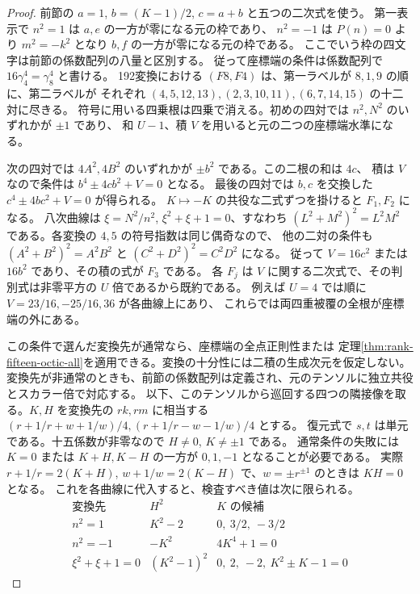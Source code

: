 \begin{proof}
前節の $a=1$, $b=(K-1)/2$, $c=a+b$ と五つの二次式を使う。
第一表示で $n^2=1$ は $a,e$ の一方が零になる元の枠であり、
$n^2=-1$ は $P(n)=0$ より $m^2=-k^2$ となり $b,f$ の一方が零になる元の枠である。
ここでいう枠の四文字は前節の係数配列の八量と区別する。
従って座標端の条件は係数配列で $16\gamma_4^4=\gamma_8^4$ と書ける。
192変換における $(F8,F4)$ は、第一ラベルが $8,1,9$ の順に、第二ラベルが
それぞれ $(4,5,12,13),(2,3,10,11),(6,7,14,15)$ の十二対に尽きる。
符号に用いる四乗根は四乗で消える。初めの四対では $n^2,N^2$ のいずれかが $\pm1$ であり、
和 $U-1$、積 $V$ を用いると元の二つの座標端水準になる。

次の四対では $4A^2,4B^2$ のいずれかが $\pm b^2$ である。この二根の和は $4c$、
積は $V$ なので条件は $b^4\pm4cb^2+V=0$ となる。
最後の四対では $b,c$ を交換した $c^4\pm4bc^2+V=0$ が得られる。
$K\mapsto-K$ の共役な二式ずつを掛けると $F_1,F_2$ になる。
八次曲線は $\xi=N^2/n^2$, $\xi^2+\xi+1=0$、すなわち
$(L^2+M^2)^2=L^2M^2$ である。各変換の $4,5$ の符号指数は同じ偶奇なので、
他の二対の条件も $(A^2+B^2)^2=A^2B^2$ と $(C^2+D^2)^2=C^2D^2$ になる。
従って $V=16c^2$ または $16b^2$ であり、その積の式が $F_3$ である。
各 $F_j$ は $V$ に関する二次式で、その判別式は非零平方の $U$ 倍であるから既約である。
例えば $U=4$ では順に $V=23/16,-25/16,36$ が各曲線上にあり、
これらでは両四重被覆の全根が座標端の外にある。

この条件で選んだ変換先が通常なら、座標端の全点正則性または
定理\ref{thm:rank-fifteen-octic-all}を適用できる。変換の十分性には二積の生成次元を仮定しない。
変換先が非通常のときも、前節の係数配列は定義され、元のテンソルに独立共役とスカラー倍で対応する。
以下、このテンソルから巡回する四つの隣接像を取る。$K,H$ を変換先の $rk,rm$ に相当する
$(r+1/r+w+1/w)/4,(r+1/r-w-1/w)/4$ とする。
復元式で $s,t$ は単元である。十五係数が非零なので $H\ne0$, $K\ne\pm1$ である。
通常条件の失敗には $K=0$ または $K+H,K-H$ の一方が $0,1,-1$ となることが必要である。
実際 $r+1/r=2(K+H)$, $w+1/w=2(K-H)$ で、$w=\pm r^{\pm1}$ のときは $KH=0$ となる。
これを各曲線に代入すると、検査すべき値は次に限られる。
\[
\begin{array}{c|l|l}
 \text{変換先} & H^2 & K\text{ の候補}\\\hline
 n^2=1 & K^2-2 & 0,\ 3/2,\ -3/2\\
 n^2=-1 & -K^2 & 4K^4+1=0\\
 \xi^2+\xi+1=0 & (K^2-1)^2 & 0,\ 2,\ -2,\ K^2\pm K-1=0
\end{array}
\]


\end{proof}
